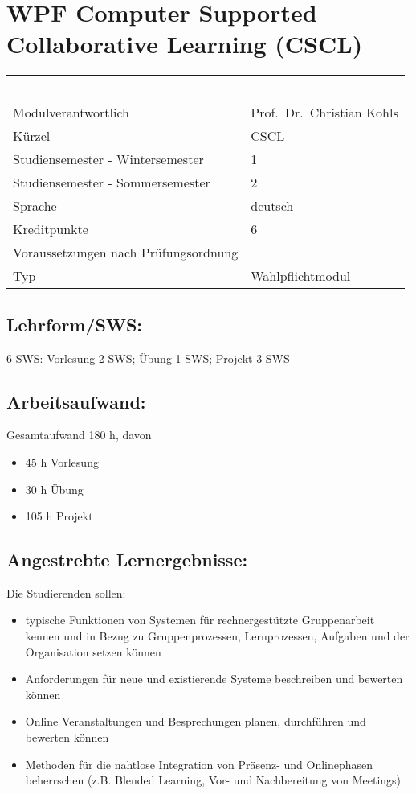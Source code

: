 \chapter{WPF Computer Supported Collaborative Learning
(CSCL)}\label{wpf-computer-supported-collaborative-learning-cscl}

\begin{longtable}[]{@{}ll@{}}
\toprule
~ & ~\tabularnewline
\midrule
\endhead
Modulverantwortlich & Prof.~Dr.~Christian Kohls\tabularnewline
Kürzel & CSCL\tabularnewline
Studiensemester - Wintersemester & 1\tabularnewline
Studiensemester - Sommersemester & 2\tabularnewline
Sprache & deutsch\tabularnewline
Kreditpunkte & 6\tabularnewline
Voraussetzungen nach Prüfungsordnung &\tabularnewline
Typ & Wahlpflichtmodul\tabularnewline
\bottomrule
\end{longtable}

\section*{Lehrform/SWS:}\label{lehrformsws-13}

6 SWS: Vorlesung 2 SWS; Übung 1 SWS; Projekt 3 SWS

\section*{Arbeitsaufwand:}\label{arbeitsaufwand-19}

Gesamtaufwand 180 h, davon

\begin{itemize}
\item
  45 h Vorlesung
\item
  30 h Übung
\item
  105 h Projekt
\end{itemize}

\section*{Angestrebte
Lernergebnisse:}\label{angestrebte-lernergebnisse-13}

Die Studierenden sollen:

\begin{itemize}
\item
  typische Funktionen von Systemen für rechnergestützte Gruppenarbeit
  kennen und in Bezug zu Gruppenprozessen, Lernprozessen, Aufgaben und
  der Organisation setzen können
\item
  Anforderungen für neue und existierende Systeme beschreiben und
  bewerten können
\item
  Online Veranstaltungen und Besprechungen planen, durchführen und
  bewerten können
\item
  Methoden für die nahtlose Integration von Präsenz- und Onlinephasen
  beherrschen (z.B. Blended Learning, Vor- und Nachbereitung von
  Meetings)
\end{itemize}

